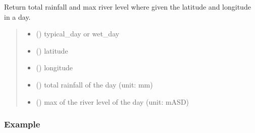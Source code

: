 \documentclass[letterpaper,10pt,english]{sphinxmanual}
\begin{document}
\begin{fulllineitems}
\label{\detokenize{index:flood_tool.get_rainfall_riverlevel_from_lat_lng}}
\pysigstartsignatures
{}
\pysigstopsignatures
\sphinxAtStartPar
Return total rainfall and max river level where given the
latitude and longitude in a day.
\begin{quote}\begin{description}
\begin{itemize}
\item {} 
\sphinxAtStartPar
{} () \textendash{} typical\_day or wet\_day

\item {} 
\sphinxAtStartPar
{} () \textendash{} latitude

\item {} 
\sphinxAtStartPar
{} () \textendash{} longitude

\end{itemize}

\sphinxAtStartPar
\begin{itemize}
\item {} 
\sphinxAtStartPar
{} () \textendash{} total rainfall of the day (unit: mm)

\item {} 
\sphinxAtStartPar
{} () \textendash{} max of the river level of the day (unit: mASD)

\end{itemize}


\end{description}\end{quote}
\subsubsection*{Example}

\begin{sphinxVerbatim}[commandchars=\\\{\}]
     
\end{sphinxVerbatim}

\end{fulllineitems}
\end{document}
